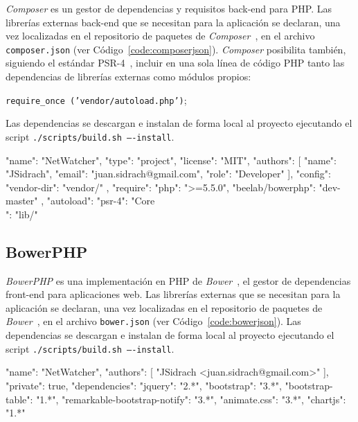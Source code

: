 \textit{Composer} es un gestor de dependencias y requisitos \gls{back-end} para \gls{PHP}.
Las librerías externas \gls{back-end} que se necesitan para la aplicación se declaran, una vez localizadas en el repositorio de paquetes de \textit{Composer}~\cite{composerrepositorio}, en el archivo \texttt{composer.json} (ver Código~\ref{code:composerjson}).
\textit{Composer} posibilita también, siguiendo el estándar PSR-4~\cite{psr4}, incluir en una sola línea de código \gls{PHP} tanto las dependencias de librerías externas como módulos propios:

\texttt{require\_once ('vendor/autoload.php')};

Las dependencias se descargan e instalan de forma local al proyecto ejecutando el \gls{script} \texttt{./scripts/build.sh ----install}.

\begin{code}[label=code:composerjson,language=json,caption=Ejemplo de fichero \textit{composer.json}]
{
  "name": "NetWatcher",
  "type": "project",
  "license": "MIT",
  "authors": [
    {
      "name": "JSidrach",
      "email": "juan.sidrach@gmail.com",
      "role": "Developer"
    }
  ],
  "config": {
    "vendor-dir": "vendor/"
   },
  "require": {
    "php": ">=5.5.0",
    "beelab/bowerphp": "dev-master"
  },
  "autoload": {
    "psr-4": {
      "Core\\": "lib/"
    }
  }
}
\end{code}

\subsection*{BowerPHP\label{extra:mvc:bowerphp}}

\textit{BowerPHP} es una implementación en \gls{PHP} de \textit{Bower}~\cite{bower}, el gestor de dependencias \gls{front-end} para aplicaciones web.
Las librerías externas que se necesitan para la aplicación se declaran, una vez localizadas en el repositorio de paquetes de \textit{Bower}~\cite{bowerrepositorio}, en el archivo \texttt{bower.json} (ver Código~\ref{code:bowerjson}).
Las dependencias se descargan e instalan de forma local al proyecto ejecutando el \gls{script} \texttt{./scripts/build.sh ----install}.

\begin{code}[label=code:bowerjson,language=json,caption=Ejemplo de fichero \textit{bower.json}]
{
  "name": "NetWatcher",
  "authors": [
    "JSidrach <juan.sidrach@gmail.com>"
  ],
  "private": true,
  "dependencies": {
    "jquery": "2.*",
    "bootstrap": "3.*",
    "bootstrap-table": "1.*",
    "remarkable-bootstrap-notify": "3.*",
    "animate.css": "3.*",
    "chartjs": "1.*"
  }
}
\end{code}

